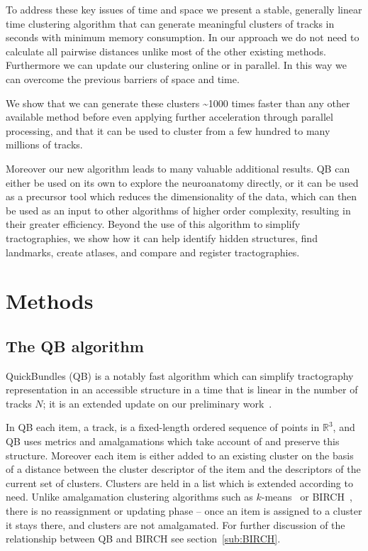 \documentclass[preprint,authoryear,a4paper,10pt,onecolumn]{elsarticle}
\begin{document}
To address these key issues of time and space we present a stable,
generally linear time clustering algorithm that can generate meaningful
clusters of tracks in seconds with minimum memory consumption. In our
approach we do not need to calculate all pairwise distances unlike most
of the other existing methods. Furthermore we can update our clustering
online or in parallel. In this way we can overcome the previous barriers
of space and time.

We show that we can generate these clusters \textasciitilde1000 times faster than
any other available method before even applying further
acceleration through parallel processing, and that it can be used to
cluster from a few hundred to many millions of tracks.

Moreover our new algorithm leads to many valuable additional results. QB
can either be used on its own to explore the neuroanatomy directly, or
it can be used as a precursor tool which reduces the dimensionality of
the data, which can then be used as an input to other algorithms of
higher order complexity, resulting in their greater efficiency. Beyond
the use of this algorithm to simplify tractographies, we show how it can
help identify hidden structures, find landmarks, create atlases, and
compare and register tractographies.

\section{Methods}

\subsection{The QB algorithm\label{sub:QB-description}}

QuickBundles (QB) is a notably fast algorithm which can simplify
tractography representation in an accessible structure in a time that is
linear in the number of tracks $N$; it is an extended update on our
preliminary work~\citep{EGMB10}.

In QB each item, a track, is a fixed-length ordered sequence of points
in $\mathbb{R}^{3}$, and QB uses metrics and amalgamations which take
account of and preserve this structure.  Moreover each item is either
added to an existing cluster on the basis of a distance between the
cluster descriptor of the item and the descriptors of the current set of
clusters. Clusters are held in a list which is extended according to
need. Unlike amalgamation clustering algorithms such as
$k$-means~\citep{steinhaus1956division, macqueen1967some} or
BIRCH~\citep{zhang1997birch}, there is no reassignment or updating phase
-- once an item is assigned to a cluster it stays there, and clusters
are not amalgamated. For further discussion of the relationship between
QB and BIRCH see section~\ref{sub:BIRCH}.
\end{document}
